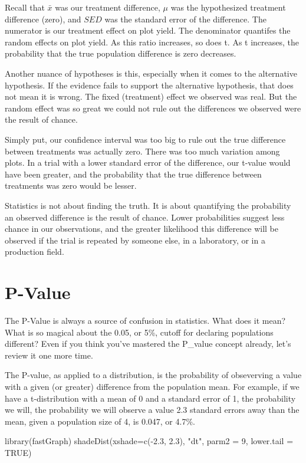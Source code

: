 \documentclass[
]{book}
\newenvironment{Shaded}{\begin{snugshade}}{\end{snugshade}}
\newcommand{\AttributeTok}[1]{\textcolor[rgb]{0.77,0.63,0.00}{#1}}
\newcommand{\ConstantTok}[1]{\textcolor[rgb]{0.00,0.00,0.00}{#1}}
\newcommand{\DecValTok}[1]{\textcolor[rgb]{0.00,0.00,0.81}{#1}}
\newcommand{\FloatTok}[1]{\textcolor[rgb]{0.00,0.00,0.81}{#1}}
\newcommand{\FunctionTok}[1]{\textcolor[rgb]{0.00,0.00,0.00}{#1}}
\newcommand{\NormalTok}[1]{#1}
\newcommand{\SpecialCharTok}[1]{\textcolor[rgb]{0.00,0.00,0.00}{#1}}
\newcommand{\StringTok}[1]{\textcolor[rgb]{0.31,0.60,0.02}{#1}}
\begin{document}
Recall that \(\bar{x}\) was our treatment difference, \(\mu\) was the hypothesized treatment difference (zero), and \(SED\) was the standard error of the difference. The numerator is our treatment effect on plot yield. The denominator quantifes the random effects on plot yield. As this ratio increases, so does t. As t increases, the probability that the true population difference is zero decreases.

Another nuance of hypotheses is this, especially when it comes to the alternative hypothesis. If the evidence fails to support the alternative hypothesis, that does not mean it is wrong. The fixed (treatment) effect we observed was real. But the random effect was so great we could not rule out the differences we observed were the result of chance.

Simply put, our confidence interval was too big to rule out the true difference between treatments was actually zero. There was too much variation among plots. In a trial with a lower standard error of the difference, our t-value would have been greater, and the probability that the true difference between treatments was zero would be lesser.

Statistics is not about finding the truth. It is about quantifying the probability an observed difference is the result of chance. Lower probabilities suggest less chance in our observations, and the greater likelihood this difference will be observed if the trial is repeated by someone else, in a laboratory, or in a production field.

\hypertarget{p-value}{%
\section{P-Value}\label{p-value}}

The P-Value is always a source of confusion in statistics. What does it mean? What is so magical about the 0.05, or 5\%, cutoff for declaring populations different? Even if you think you've mastered the P\_value concept already, let's review it one more time.

The P-value, as applied to a distribution, is the probability of obseverving a value with a given (or greater) difference from the population mean. For example, if we have a t-distribution with a mean of 0 and a standard error of 1, the probability we will, the probability we will observe a value 2.3 standard errors away than the mean, given a population size of 4, is 0.047, or 4.7\%.

\begin{Shaded}
\begin{Highlighting}[]
\FunctionTok{library}\NormalTok{(fastGraph)}
\FunctionTok{shadeDist}\NormalTok{(}\AttributeTok{xshade=}\FunctionTok{c}\NormalTok{(}\SpecialCharTok{{-}}\FloatTok{2.3}\NormalTok{, }\FloatTok{2.3}\NormalTok{), }\StringTok{"dt"}\NormalTok{, }\AttributeTok{parm2 =} \DecValTok{9}\NormalTok{, }\AttributeTok{lower.tail =} \ConstantTok{TRUE}\NormalTok{)}
\end{Highlighting}
\end{Shaded}
\end{document}
